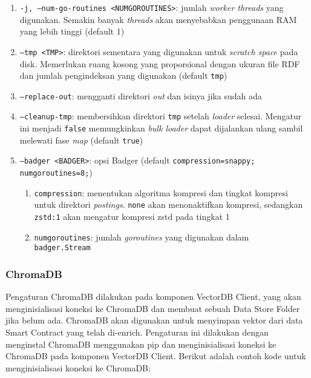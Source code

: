 \begin{enumerate}
\begin{enumerate}
		      \item \texttt{-j, --num-go-routines <NUM\textunderscore GO\textunderscore ROUTINES>}: jumlah \textit{worker threads} yang digunakan. Semakin banyak \textit{threads} akan menyebabkan penggunaan RAM yang lebih tinggi (default 1)
		      \item \texttt{--tmp <TMP>}: direktori sementara yang digunakan untuk \textit{scratch space} pada disk. Memerlukan ruang kosong yang proporsional dengan ukuran file RDF dan jumlah pengindeksan yang digunakan (default \texttt{tmp})
		      \item \texttt{--replace-out}: mengganti direktori \textit{out} dan isinya jika sudah ada
		      \item \texttt{--cleanup-tmp}: membersihkan direktori \texttt{tmp} setelah \textit{loader} selesai. Mengatur ini menjadi \texttt{false} memungkinkan \textit{bulk loader} dapat dijalankan ulang sambil melewati fase \textit{map} (default \texttt{true})
		      \item \texttt{--badger <BADGER>}: opsi Badger (default \texttt{compression=snappy; numgoroutines=8;})
		            \begin{enumerate}
			            \item \texttt{compression}: menentukan algoritma kompresi dan tingkat kompresi untuk direktori \textit{postings}. \texttt{none} akan menonaktifkan kompresi, sedangkan \texttt{zstd:1} akan mengatur kompresi zstd pada tingkat 1
			            \item \texttt{numgoroutines}: jumlah \textit{goroutines} yang digunakan dalam \\\texttt{badger.Stream}
		            \end{enumerate}
	      \end{enumerate}
\end{enumerate}

\subsubsection{ChromaDB}

Pengaturan ChromaDB dilakukan pada komponen VectorDB Client, yang akan menginisialisasi koneksi ke ChromaDB dan membuat sebuah Data Store Folder jika belum ada. ChromaDB akan digunakan untuk menyimpan vektor dari data Smart Contract yang telah di-enrich. Pengaturan ini dilakukan dengan menginstal ChromaDB menggunakan pip dan menginisialisasi koneksi ke ChromaDB pada komponen VectorDB Client. Berikut adalah contoh kode untuk menginisialisasi koneksi ke ChromaDB:

